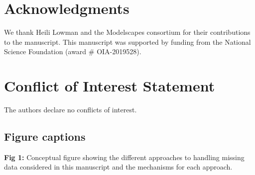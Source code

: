 \documentclass[12pt,english]{article} %
\begin{document}
\begin{linenumbers}
\begin{spacing}{1.9}
\begin{flushleft}
\vspace{-2.5em}

\section*{Acknowledgments}
\vspace{-1em}
We thank Heili Lowman and the Modelscapes consortium for their contributions to the manuscript. This manuscript was supported by funding from the National Science Foundation (award \# OIA-2019528).

\vspace{-2.5em}
\section*{Conflict of Interest Statement}
\vspace{-1em}
The authors declare no conflicts of interest. 



\newpage

%
%
\printbibliography

\newpage
\begin{spacing}{1.7}
\section*{Figure captions}

{\textbf{Fig 1:} Conceptual figure showing the different approaches to handling missing data considered in this manuscript and the mechanisms for each approach.}


\end{spacing}
\end{flushleft}
\end{spacing}
\end{linenumbers}
\end{document}

